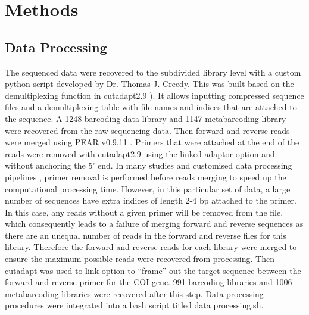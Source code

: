 \documentclass[11pt, a4paper]{article}
\begin{document}
\section{Methods}
\subsection{Data Processing}
The sequenced data were recovered to the subdivided library level with a custom python script developed by Dr. Thomas J. Creedy. This  was built based on the demultiplexing function in cutadapt2.9 \cite{cutadapt}). It allows inputting compressed sequence files and a demultiplexing table with file names and indices that are attached to the sequence. A 1248 barcoding data library and 1147 metabarcoding library were recovered from the raw sequencing data. Then forward and reverse reads were merged using PEAR v0.9.11 \cite{Zhang2014}. Primers that were attached at the end of the reads were removed with cutadapt2.9 \cite{cutadapt} using the linked adaptor option and without anchoring the 5’ end. In many studies and customised data processing pipelines \cite{Creedy2019,Creedy2020}, primer removal is performed before reads merging to speed up the computational processing time. However, in this particular set of data, a large number of sequences have extra indices of length 2-4 bp attached to the primer. In this case, any reads without a given primer will be removed from the file, which consequently leads to a failure of merging forward and reverse sequences as there are an unequal number of reads in the forward and reverse files for this library. Therefore the forward and reverse reads for each library were merged to ensure the maximum possible reads were recovered from processing.  Then cutadapt was used to link option to “frame” out the target sequence between the forward and reverse primer for the COI gene. 991 barcoding libraries and 1006 metabarcoding libraries were recovered after this step. Data processing  procedures were integrated into a bash script titled data processing.sh.
\end{document}
